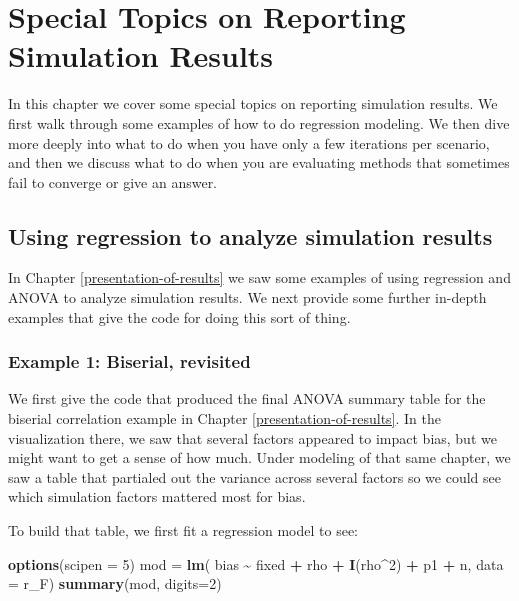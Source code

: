 \documentclass[
]{book}
\newenvironment{Shaded}{\begin{snugshade}}{\end{snugshade}}
\newcommand{\AttributeTok}[1]{\textcolor[rgb]{0.13,0.29,0.53}{#1}}
\newcommand{\DecValTok}[1]{\textcolor[rgb]{0.00,0.00,0.81}{#1}}
\newcommand{\FunctionTok}[1]{\textcolor[rgb]{0.13,0.29,0.53}{\textbf{#1}}}
\newcommand{\NormalTok}[1]{#1}
\newcommand{\OtherTok}[1]{\textcolor[rgb]{0.56,0.35,0.01}{#1}}
\newcommand{\SpecialCharTok}[1]{\textcolor[rgb]{0.81,0.36,0.00}{\textbf{#1}}}
\begin{document}
\chapter{Special Topics on Reporting Simulation Results}\label{special-topics-on-reporting-simulation-results}

In this chapter we cover some special topics on reporting simulation results.
We first walk through some examples of how to do regression modeling.
We then dive more deeply into what to do when you have only a few iterations per scenario, and then we discuss what to do when you are evaluating methods that sometimes fail to converge or give an answer.

\section{Using regression to analyze simulation results}\label{using-regression-to-analyze-simulation-results}

In Chapter \ref{presentation-of-results} we saw some examples of using regression and ANOVA to analyze simulation results.
We next provide some further in-depth examples that give the code for doing this sort of thing.

\subsection{Example 1: Biserial, revisited}\label{example-1-biserial-revisited-1}

We first give the code that produced the final ANOVA summary table for the biserial correlation example in Chapter \ref{presentation-of-results}.
In the visualization there, we saw that several factors appeared to impact bias, but we might want to get a sense of how much.
Under modeling of that same chapter, we saw a table that partialed out the variance across several factors so we could see which simulation factors mattered most for bias.

To build that table, we first fit a regression model to see:

\begin{Shaded}
\begin{Highlighting}[]
\FunctionTok{options}\NormalTok{(}\AttributeTok{scipen =} \DecValTok{5}\NormalTok{)}
\NormalTok{mod }\OtherTok{=} \FunctionTok{lm}\NormalTok{( bias }\SpecialCharTok{\textasciitilde{}}\NormalTok{ fixed }\SpecialCharTok{+}\NormalTok{ rho }\SpecialCharTok{+} \FunctionTok{I}\NormalTok{(rho}\SpecialCharTok{\^{}}\DecValTok{2}\NormalTok{) }\SpecialCharTok{+}\NormalTok{ p1 }\SpecialCharTok{+}\NormalTok{ n, }\AttributeTok{data =}\NormalTok{ r\_F)}
\FunctionTok{summary}\NormalTok{(mod, }\AttributeTok{digits=}\DecValTok{2}\NormalTok{)}
\end{Highlighting}
\end{Shaded}
\end{document}

